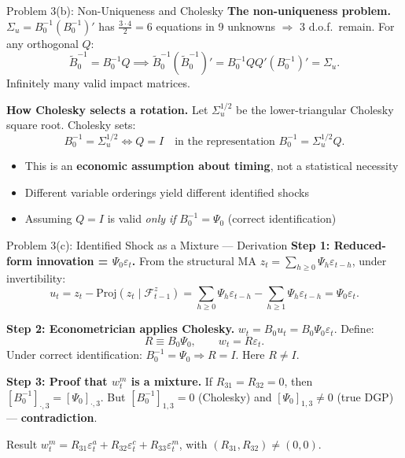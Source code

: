 \documentclass[aspectratio=169,11pt]{beamer}
\begin{document}
\begin{frame}{Problem 3(b): Non-Uniqueness and Cholesky}
    \textbf{The non-uniqueness problem.} $\Sigma_u = B_0^{-1}(B_0^{-1})'$ has $\tfrac{3\cdot 4}{2}=6$ equations in 9 unknowns $\Rightarrow$ 3 d.o.f.\ remain. For any orthogonal $Q$:
    \[
    \tilde{B}_0^{-1} = B_0^{-1}Q \implies \tilde{B}_0^{-1}(\tilde{B}_0^{-1})' = B_0^{-1}QQ'(B_0^{-1})' = \Sigma_u.
    \]
    Infinitely many valid impact matrices.

    \vspace{0.3em}
    \textbf{How Cholesky selects a rotation.} Let $\Sigma_u^{1/2}$ be the lower-triangular Cholesky square root. Cholesky sets:
    \[
    B_0^{-1} = \Sigma_u^{1/2} \iff Q = I \quad \text{in the representation } B_0^{-1} = \Sigma_u^{1/2}Q.
    \]
    \begin{itemize}
        \item This is an \textbf{economic assumption about timing}, not a statistical necessity
        \item Different variable orderings yield different identified shocks
        \item \textcolor{mitred}{Assuming $Q=I$ is valid \textit{only if} $B_0^{-1} = \Psi_0$ (correct identification)}
    \end{itemize}
\end{frame}

\begin{frame}{Problem 3(c): Identified Shock as a Mixture --- Derivation}
    \textbf{Step 1: Reduced-form innovation = $\Psi_0\varepsilon_t$.} From the structural MA $z_t = \sum_{h\geq0}\Psi_h\varepsilon_{t-h}$, under invertibility:
    \[
    u_t = z_t - \mathrm{Proj}(z_t \mid \mathcal{F}^z_{t-1}) = \sum_{h\geq0}\Psi_h\varepsilon_{t-h} - \sum_{h\geq1}\Psi_h\varepsilon_{t-h} = \Psi_0\varepsilon_t.
    \]

    \textbf{Step 2: Econometrician applies Cholesky.} $w_t = B_0 u_t = B_0\Psi_0\varepsilon_t$. Define:
    \[
    R \equiv B_0\Psi_0, \qquad w_t = R\varepsilon_t.
    \]
    Under correct identification: $B_0^{-1} = \Psi_0 \Rightarrow R = I$. \textcolor{mitred}{Here $R \neq I$.}

    \vspace{0.3em}
    \textbf{Step 3: Proof that $w_t^m$ is a mixture.} If $R_{31}=R_{32}=0$, then $[B_0^{-1}]_{\cdot,3} = [\Psi_0]_{\cdot,3}$. But $[B_0^{-1}]_{1,3}=0$ (Cholesky) and $[\Psi_0]_{1,3}\neq0$ (true DGP) --- \textbf{contradiction}.

    \begin{alertblock}{Result}
        $w_t^m = R_{31}\varepsilon_t^a + R_{32}\varepsilon_t^c + R_{33}\varepsilon_t^m$, with $(R_{31},R_{32})\neq(0,0)$.
    \end{alertblock}
\end{frame}
\end{document}
